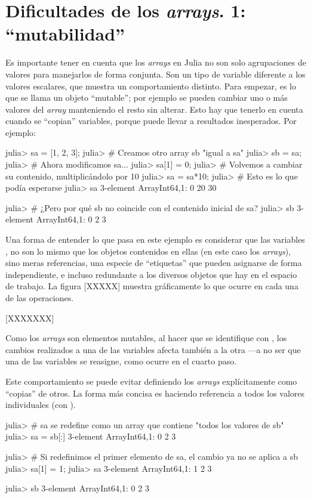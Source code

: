 \section{Dificultades de los \emph{arrays}. 1: ``mutabilidad''}

Es importante tener en cuenta que los \emph{arrays} en Julia no son solo agrupaciones de valores para manejarlos de forma conjunta. Son un tipo de variable diferente a los valores escalares, que muestra un comportamiento distinto. Para empezar, es lo que se llama un objeto ``mutable''; por ejemplo se pueden cambiar uno o más valores del \emph{array} manteniendo el resto sin alterar. Esto hay que tenerlo en cuenta cuando se ``copian'' variables, porque puede llevar a resultados inesperados. Por ejemplo:

\begin{jlconcode}
julia> sa = [1, 2, 3];
julia> # Creamos otro array sb "igual a sa"
julia> sb = sa;
julia> # Ahora modificamos sa...
julia> sa[1] = 0;
julia> # Volvemos a cambiar su contenido, multiplicándolo por 10
julia> sa = sa*10;
julia> # Esto es lo que podía esperarse
julia> sa
3-element Array{Int64,1}:
  0
 20
 30

julia> # ¿Pero por qué sb no coincide con el contenido inicial de sa?
julia> sb
3-element Array{Int64,1}:
 0
 2
 3
\end{jlconcode}

Una forma de entender lo que pasa en este ejemplo es considerar que las variables ,  no son lo mismo que los objetos contenidos en ellas (en este caso los \emph{arrays}), sino meras referencias, una especie de ``etiquetas'' que pueden asignarse de forma independiente, e incluso redundante a los diversos objetos que hay en el espacio de trabajo. La figura [XXXXX] muestra gráficamente lo que ocurre en cada una de las operaciones.

[XXXXXXX]

Como los \emph{arrays} son elementos mutables, al hacer que  se identifique con , los cambios realizados a una de las variables afecta también a la otra ---a no ser que una de las variables se reasigne, como ocurre en el cuarto paso.

Este comportamiento se puede evitar definiendo los \emph{arrays} explícitamente como ``copias'' de otros. La forma más concisa es haciendo referencia a todos los valores individuales (con \code{[:]}).

\begin{jlconcode}
julia> # sa se redefine como un array que contiene "todos los valores de sb"
julia> sa = sb[:]
3-element Array{Int64,1}:
 0
 2
 3

julia> # Si redefinimos el primer elemento de sa, el cambio ya no se aplica a sb
julia> sa[1] = 1;
julia> sa
3-element Array{Int64,1}:
 1
 2
 3

julia> sb
3-element Array{Int64,1}:
 0
 2
 3
\end{jlconcode}


